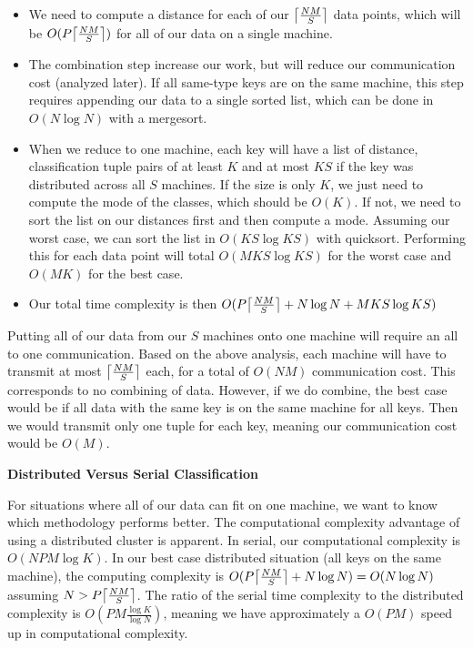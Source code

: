 \begin{itemize}
\item We need to compute a distance for each of our $\ceil*{\frac{N M}{S}}$ 
data points, which will be $O(P \ceil*{\frac{N M}{S}})$ for all of our data on 
a single machine. 
\item The combination step increase our work, but will reduce our communication 
cost (analyzed later). If all same-type keys are on the same machine, this 
step requires appending our data to a single sorted list, which can be done in 
$O(N \log N)$ with a mergesort.
\item When we reduce to one machine, each key will have a list of distance, 
classification tuple pairs of at least $K$ and at most $K S$ if the key was 
distributed across all $S$ machines. If the size is only $K$, we just need to 
compute the mode of the classes, which should be $O(K)$. If not, we need to 
sort the list on our distances first and then compute a mode. Assuming our 
worst case, we can sort the list in $O(K S \log K S)$ with quicksort. 
Performing this for each data point will total $O(M K S \log K S)$ for the 
worst case and $O(M K)$ for the best case.
\item Our total time complexity is then 
$O(P \ceil*{\frac{N M}{S}} + N \log N + M K S \log K S)$
\end{itemize}

\vspace{5 mm}
\noindent
Putting all of our data from our $S$ machines onto one machine will require an 
all to one communication. Based on the above analysis, each machine will have 
to transmit at most $\ceil*{\frac{N M}{S}}$ each, for a total of $O(N M)$ 
communication cost. This corresponds to no combining of data. However, if we do 
combine, the best case would be if all data with the same key is on the same 
machine for all keys. Then we would transmit only one tuple for each key, 
meaning our communication cost would be $O(M)$.

\vspace{5 mm}
\noindent
\textbf{Distributed Versus Serial Classification}

\vspace{5 mm}
\noindent
For situations where all of our data can fit on one machine, we want to know 
which methodology performs better. The computational complexity advantage of 
using a distributed cluster is apparent. In serial, our computational 
complexity is $O(N P M \log K)$. In our best case distributed situation (all 
keys on the same machine), the computing complexity is 
$O(P \ceil*{\frac{N M}{S}} + N \log N) = O(N \log N)$ assuming 
$N > P \ceil*{\frac{N M}{S}}$. The ratio of the serial time complexity to the 
distributed complexity is $O(P M \frac{\log K}{\log N})$, meaning we have 
approximately a $O(P M)$ speed up in computational complexity.

